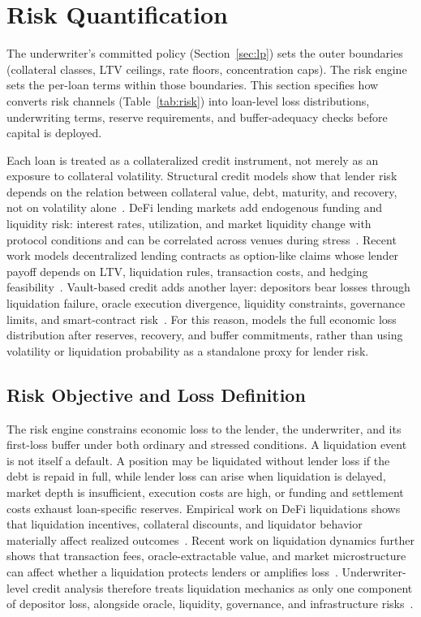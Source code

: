 \section{Risk Quantification}
\label{sec:risk}

The underwriter's committed policy (Section~\ref{sec:lp}) sets the outer boundaries
(collateral classes, LTV ceilings, rate floors, concentration caps). The risk
engine sets the per-loan terms within those boundaries. This section specifies
how \daloc{} converts risk channels (Table~\ref{tab:risk}) into
loan-level loss distributions, underwriting terms, reserve requirements, and
buffer-adequacy checks before capital is deployed.

Each loan is treated as a collateralized credit instrument, not merely as an
exposure to collateral volatility. Structural credit models show that lender
risk depends on the relation between collateral value, debt, maturity, and
recovery, not on volatility alone~\cite{merton1974}. DeFi lending markets add
endogenous funding and liquidity risk: interest rates, utilization, and market
liquidity change with protocol conditions and can be correlated across venues
during stress~\cite{gudgeon2020}. Recent work models decentralized lending
contracts as option-like claims whose lender payoff depends on LTV, liquidation
rules, transaction costs, and hedging feasibility~\cite{szpruch2024}. Vault-based
credit adds another layer: depositors bear losses through liquidation failure,
oracle execution divergence, liquidity constraints, governance limits, and
smart-contract risk~\cite{zbandut2026}. For this reason, \daloc{} models the
full economic loss distribution after reserves, recovery, and buffer
commitments, rather than using volatility or liquidation probability as a
standalone proxy for lender risk.

\subsection{Risk Objective and Loss Definition}

The risk engine constrains economic loss to the lender, the underwriter, and
its first-loss buffer under both ordinary and stressed conditions.
A liquidation event is not itself a default. A position may be liquidated without
lender loss if the debt is repaid in full, while lender loss can arise when
liquidation is delayed, market depth is insufficient, execution costs are high,
or funding and settlement costs exhaust loan-specific reserves. Empirical work
on DeFi liquidations shows that liquidation incentives, collateral discounts,
and liquidator behavior materially affect realized outcomes~\cite{perez2021,qin2021}.
Recent work on liquidation dynamics further shows that transaction fees,
oracle-extractable value, and market microstructure can affect whether a
liquidation protects lenders or amplifies loss~\cite{sadeghi2026}. Underwriter-level
credit analysis therefore treats liquidation mechanics as only one component
of depositor loss, alongside oracle, liquidity, governance, and infrastructure
risks~\cite{zbandut2026}.

